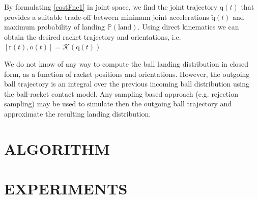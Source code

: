 \documentclass[letterpaper, 10 pt, conference]{ieeeconf}
\newcommand{\boldvec}[1]{\boldsymbol{\mathrm{#1}}}
\let\vec\boldvec
\newcommand{\kin}{\mathcal{K}} %
\newcommand{\joint}{\vec{q}} %
\newcommand{\racket}{\vec{r}} %
\newcommand{\orient}{\vec{o}} %
\newcommand{\prob}{\mathbb{P}} %
\begin{document}
By formulating \eqref{costFnc1} in joint space, we find the joint trajectory $\joint(t)$ that provides a suitable trade-off between minimum joint accelerations $\ddot{\joint}(t)$ and maximum probability of landing $\prob(\textrm{land})$. Using direct kinematics we can obtain the desired racket trajectory and orientations, i.e. $[\racket(t),\orient(t)] = \kin(\joint(t))$.




% 

%
%
%

We do not know of any way to compute the ball landing distribution in closed form, as a function of racket positions and orientations. However, the outgoing ball trajectory is an integral over the previous incoming ball distribution using the ball-racket contact model. Any sampling based approach (e.g. rejection sampling) may be used to simulate then the outgoing ball trajectory and approximate the resulting landing distribution. 


\section{ALGORITHM}\label{alg}

\section{EXPERIMENTS}\label{results}

\end{document}

